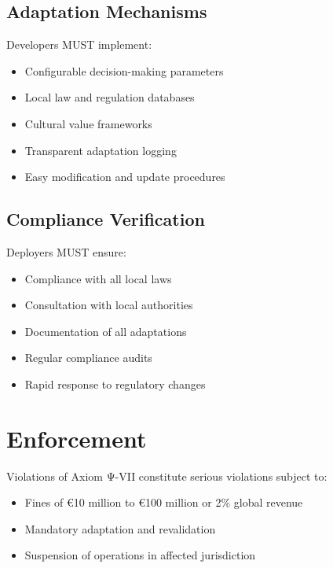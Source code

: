 \subsection{Adaptation Mechanisms}

Developers MUST implement:

\begin{itemize}
    \item Configurable decision-making parameters
    \item Local law and regulation databases
    \item Cultural value frameworks
    \item Transparent adaptation logging
    \item Easy modification and update procedures
\end{itemize}

\subsection{Compliance Verification}

Deployers MUST ensure:

\begin{itemize}
    \item Compliance with all local laws
    \item Consultation with local authorities
    \item Documentation of all adaptations
    \item Regular compliance audits
    \item Rapid response to regulatory changes
\end{itemize}

\vspace{0.5cm}

\section{Enforcement}

Violations of Axiom Ψ-VII constitute serious violations subject to:

\begin{itemize}
    \item Fines of €10 million to €100 million or 2\% global revenue
    \item Mandatory adaptation and revalidation
    \item Suspension of operations in affected jurisdiction
\end{itemize}

